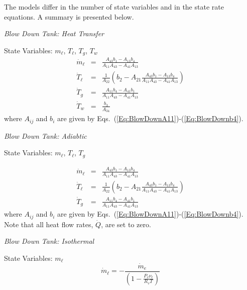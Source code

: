 %
The models differ in the number of state variables and in the state
rate equations.  A summary is presented below.

\noindent\textit{Blow Down Tank: Heat Transfer}

\noindent State Variables:  $m_\ell$, $T_\ell$, $T_g$, $T_w$
%
\begin{eqnarray}
  \dot{m}_\ell &=& \frac{A_{43} b_{1}-A_{13} b_{4}}{A_{11} A_{43}-A_{41} A_{13}}\nonumber \\
  \dot{T}_\ell &=& \frac{1}{A_{22}}\left( b_2 -  A_{21} \frac{A_{43} b_{1}-A_{13} b_{4}}{A_{11} A_{43}-A_{41}
  A_{13}}\right) \nonumber \\
  \dot{T}_g &=& \frac{A_{11} b_{4} - A_{41} b_{1}}{A_{11} A_{43}-A_{41}
  A_{13}} \nonumber \\
  \dot{T}_w &=& \frac{b_3}{A_{34}} \nonumber
\end{eqnarray}
%
where $A_{ij}$ and $b_i$ are given by
Eqs.~(\ref{Eq:BlowDownA11})-(\ref{Eq:BlowDownb4}).

\noindent\textit{Blow Down Tank:  Adiabtic}

\noindent State Variables:  $m_\ell$, $T_\ell$, $T_g$

%
\begin{eqnarray}
  \dot{m}_\ell &=& \frac{A_{43} b_{1}-A_{13} b_{4}}{A_{11} A_{43}-A_{41} A_{13}}\nonumber \\
  \dot{T}_\ell &=& \frac{1}{A_{22}}\left( b_2 -  A_{21} \frac{A_{43} b_{1}-A_{13} b_{4}}{A_{11} A_{43}-A_{41}
  A_{13}}\right) \nonumber \\
  \dot{T}_g &=& \frac{A_{11} b_{4} - A_{41} b_{1}}{A_{11} A_{43}-A_{41}
  A_{13}} \nonumber
\end{eqnarray}
%
where $A_{ij}$ and $b_i$ are given by
Eqs.~(\ref{Eq:BlowDownA11})-(\ref{Eq:BlowDownb4}).  Note that all
heat flow rates, $\dot{Q}$, are set to zero.

\noindent\textit{Blow Down Tank:  Isothermal}

\noindent State Variables:  $m_\ell$
%
\begin{equation}
    \dot{m}_\ell = -\frac{\dot{m}_e}{\left( 1 - \displaystyle\frac{P_v \nu_\ell}{R_v
    T}\right)} \nonumber
\end{equation}

